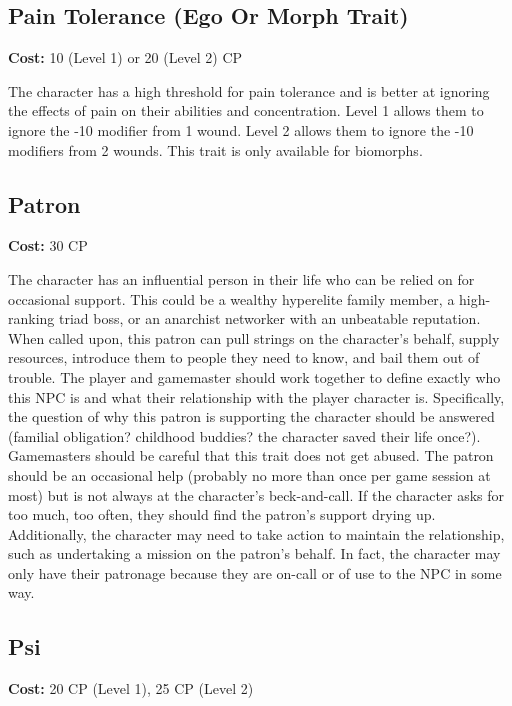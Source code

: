 \subsection{Pain Tolerance (Ego Or Morph Trait)} \label{sec:traits-pain-tolerance} 

\textbf{Cost:} 10 (Level 1) or 20 (Level 2) CP 

The character has a high threshold for pain tolerance and is better at ignoring the effects of pain on their abilities and concentration. Level 1 allows them to ignore the -10 modifier from 1 wound. Level 2 allows them to ignore the -10 modifiers from 2 wounds. This trait is only available for biomorphs. 

\subsection{Patron} \label{sec:traits-patron} 

\textbf{Cost:} 30 CP 

The character has an influential person in their life who can be relied on for occasional support. This could be a wealthy hyperelite family member, a high-ranking triad boss, or an anarchist networker with an unbeatable reputation. When called upon, this patron can pull strings on the character’s behalf, supply resources, introduce them to people they need to know, and bail them out of trouble. The player and gamemaster should work together to define exactly who this NPC is and what their relationship with the player character is. Specifically, the question of why this patron is supporting the character should be answered (familial obligation? childhood buddies? the character saved their life once?). Gamemasters should be careful that this trait does not get abused. The patron should be an occasional help (probably no more than once per game session at most) but is not always at the character’s beck-and-call. If the character asks for too much, too often, they should find the patron’s support drying up. Additionally, the character may need to take action to maintain the relationship, such as undertaking a mission on the patron’s behalf. In fact, the character may only have their patronage because they are on-call or of use to the NPC in some way. 

\subsection{Psi} \label{sec:traits-psi} \textbf{Cost:} 20 CP (Level 1), 25 CP (Level 2) 

